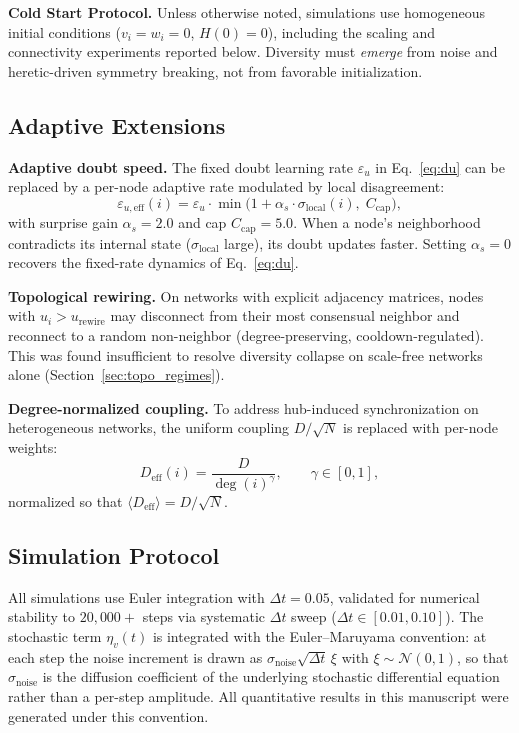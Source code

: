 ﻿\documentclass[11pt]{article}
\begin{document}
\textbf{Cold Start Protocol.} Unless otherwise noted, simulations use homogeneous initial conditions ($v_i = w_i = 0$, $H(0) = 0$), including the scaling and connectivity experiments reported below. Diversity must \emph{emerge} from noise and heretic-driven symmetry breaking, not from favorable initialization.

\subsection{Adaptive Extensions}
\label{sec:adaptive}

\textbf{Adaptive doubt speed.} The fixed doubt learning rate $\varepsilon_u$ in Eq.~\ref{eq:du} can be replaced by a per-node adaptive rate modulated by local disagreement:
\begin{equation}
\varepsilon_{u,\text{eff}}(i) = \varepsilon_u \cdot \min\!\bigl(1 + \alpha_s \cdot \sigma_{\text{local}}(i),\; C_{\text{cap}}\bigr),
\label{eq:meta_doubt}
\end{equation}
with surprise gain $\alpha_s = 2.0$ and cap $C_{\text{cap}} = 5.0$. When a node's neighborhood contradicts its internal state ($\sigma_{\text{local}}$ large), its doubt updates faster. Setting $\alpha_s = 0$ recovers the fixed-rate dynamics of Eq.~\ref{eq:du}.

\textbf{Topological rewiring.} On networks with explicit adjacency matrices, nodes with $u_i > u_{\text{rewire}}$ may disconnect from their most consensual neighbor and reconnect to a random non-neighbor (degree-preserving, cooldown-regulated). This was found insufficient to resolve diversity collapse on scale-free networks alone (Section~\ref{sec:topo_regimes}).

\textbf{Degree-normalized coupling.} To address hub-induced synchronization on heterogeneous networks, the uniform coupling $D/\sqrt{N}$ is replaced with per-node weights:
\begin{equation}
D_{\text{eff}}(i) = \frac{D}{\deg(i)^\gamma}, \qquad \gamma \in [0, 1],
\label{eq:degree_norm}
\end{equation}
normalized so that $\langle D_{\text{eff}} \rangle = D/\sqrt{N}$.

\subsection{Simulation Protocol}

All simulations use Euler integration with $\Delta t = 0.05$, validated for numerical stability to $20{,}000+$ steps via systematic $\Delta t$ sweep ($\Delta t \in [0.01, 0.10]$). The stochastic term $\eta_v(t)$ is integrated with the Euler--Maruyama convention: at each step the noise increment is drawn as $\sigma_{\text{noise}} \sqrt{\Delta t}\, \xi$ with $\xi \sim \mathcal{N}(0,1)$, so that $\sigma_{\text{noise}}$ is the diffusion coefficient of the underlying stochastic differential equation rather than a per-step amplitude. All quantitative results in this manuscript were generated under this convention.
\end{document}
